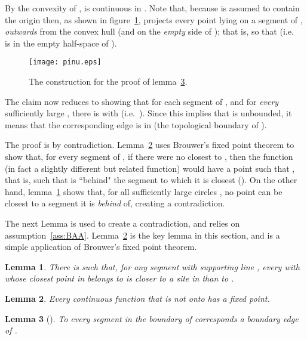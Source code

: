 \documentclass[11pt]{article}
\newtheorem{lemma}{Lemma}
\begin{document}
By the convexity of ,  is continuous in . 
Note that, because  is assumed to contain the origin then, 
	as shown in figure~\ref{fig:pinu},  projects 
every point  lying on a segment of , 
\emph{outwards} from the convex hull (and on the \emph{empty} side of
); that is, so that 
(i.e.~ is in the empty half-space of ). 

\begin{figure}[htbp]
   \centering
   	\texttt{[image: pinu.eps]} \caption{The construction for the proof of lemma~\ref{lem:hard}.}
   \label{fig:pinu}
\end{figure}



The claim now reduces to showing that for each segment 
	 of , and for \emph{every} sufficiently large , 
there is  with  (i.e.~). 
Since this implies that  is unbounded, 
	it means that the corresponding edge  is in  (the topological boundary of ).

The proof is by contradiction. 
Lemma~\ref{lem:Sn} uses Brouwer's fixed point theorem to show that, for every segment  of , 
if there were no  closest to , then the function  
(in fact a slightly different but related function) 
would have a point  such that
, that is, such that 
 is ``behind" the segment  to which it is
closest (). 
On the other hand, lemma~\ref{lem:contrad} shows that, for all sufficiently large circles , no
point  can be closest to a segment
 it is \emph{behind} of, creating a contradiction. 



The next Lemma is used to create a contradiction, and relies on assumption~\ref{ass:BAA}. 
Lemma~\ref{lem:Sn} is the key lemma in this section, and is a simple application of Brouwer's fixed point theorem. 

\begin{lemma}\label{lem:contrad}
There is  such that, for any segment  with supporting line , 
	 every  with  whose closest point in  belongs to  is 
	closer to a site in  than to .
\end{lemma}



\begin{lemma}\label{lem:Sn}
	Every continuous function  that is not onto has a fixed point. 
\end{lemma}




\begin{lemma}[]\label{lem:hard}
 To every segment  in the boundary of
 corresponds a boundary edge of .
\end{lemma}
\end{document}
